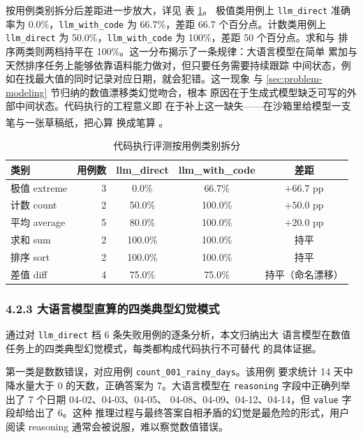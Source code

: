 \documentclass[a4paper]{article}
\newcommand{\song}{\CJKfamily{song}}
\newcommand{\wuhao}{\fontsize{10.5pt}{18pt}\selectfont}
\theoremstyle{definition}
\theoremstyle{plain}
\theoremstyle{remark}
\newcommand{\reftab}[1]{表 \ref{#1}}
\let\oldcite\cite
\renewcommand{\cite}[1]{\textsuperscript{\oldcite{#1}}}
\newcommand{\bk}{\discretionary{}{}{}}
\begin{document}
按用例类别拆分后差距进一步放大，详见 \reftab{tab:code-eval-category}。
极值类用例上 \texttt{llm\_\bk{}direct} 准确率为 0.0\%，\texttt{llm\_\bk{}with\_\bk{}code}
为 66.7\%，差距 66.7 个百分点。计数类用例上 \texttt{llm\_\bk{}direct} 为
50.0\%，\texttt{llm\_\bk{}with\_\bk{}code} 为 100\%，差距 50 个百分点。求和与
排序两类则两档持平在 100\%。这一分布揭示了一条规律：大语言模型在简单
累加与天然排序任务上能够依靠语料能力做对，但只要任务需要持续跟踪
中间状态，例如在找最大值的同时记录对应日期，就会犯错。这一现象
与 \ref{sec:problem-modeling} 节归纳的数值漂移类幻觉吻合，根本
原因在于生成式模型缺乏可写的外部中间状态。代码执行的工程意义即
在于补上这一缺失——在沙箱里给模型一支笔与一张草稿纸，把心算
换成笔算 \cite{ref20}。

\begin{table}[!ht]
    \centering
    \caption{代码执行评测按用例类别拆分}
    \label{tab:code-eval-category}
    \song\wuhao
    \begin{tabular}{lrccc}
        \toprule
        类别 & 用例数 & llm\_direct & llm\_with\_code & 差距 \\
        \midrule
        极值 extreme & 3 & 0.0\% & 66.7\% & $+66.7$ pp \\
        计数 count & 2 & 50.0\% & 100.0\% & $+50.0$ pp \\
        平均 average & 5 & 80.0\% & 100.0\% & $+20.0$ pp \\
        求和 sum & 2 & 100.0\% & 100.0\% & 持平 \\
        排序 sort & 2 & 100.0\% & 100.0\% & 持平 \\
        差值 diff & 4 & 75.0\% & 75.0\% & 持平（命名漂移） \\
        \bottomrule
    \end{tabular}
\end{table}

\subsubsection*{4.2.3 \quad 大语言模型直算的四类典型幻觉模式}

通过对 \texttt{llm\_\bk{}direct} 档 6 条失败用例的逐条分析，本文归纳出大
语言模型在数值任务上的四类典型幻觉模式，每类都构成代码执行不可替代
的具体证据。

第一类是数数错误，对应用例 \texttt{count\_\bk{}001\_\bk{}rainy\_\bk{}days}。该用例
要求统计 14 天中降水量大于 0 的天数，正确答案为 7。大语言模型在
\texttt{reasoning} 字段中正确列举出了 7 个日期 04-02、04-03、04-05、
04-08、04-09、04-12、04-14，但 \texttt{value} 字段却给出了 6。这种
推理过程与最终答案自相矛盾的幻觉是最危险的形式，用户阅读 reasoning
通常会被说服，难以察觉数值错误。
\end{document}
